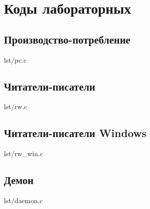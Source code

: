 \section{Коды лабораторных}

\subsection{Производство-потребление}

\begin{lstinputlisting}[
        label={lst:},
        caption={}
    ]{lst/pc.c}
\end{lstinputlisting}

\newpage

\subsection{Читатели-писатели}

\begin{lstinputlisting}[
        label={lst:},
        caption={}
    ]{lst/rw.c}
\end{lstinputlisting}

\newpage

\subsection{Читатели-писатели Windows}

\begin{lstinputlisting}[
        label={lst:},
        caption={}
    ]{lst/rw_win.c}
\end{lstinputlisting}

\newpage

\subsection{Демон}

\begin{lstinputlisting}[
        label={lst:},
        caption={}
    ]{lst/daemon.c}
\end{lstinputlisting}

